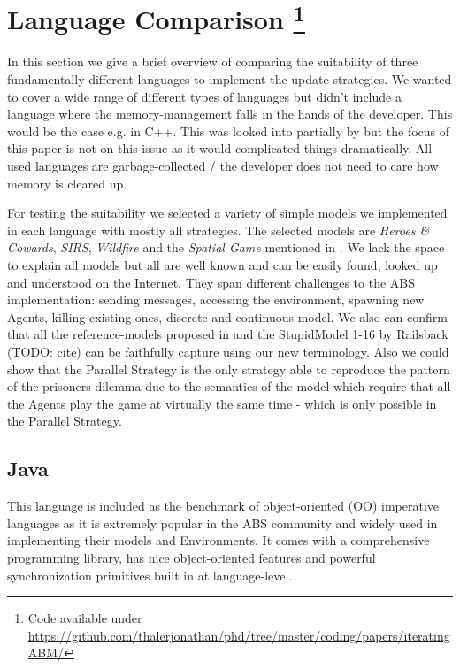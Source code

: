\section[Language Comparison]{Language Comparison \footnote{Code available under\\ \url{https://github.com/thalerjonathan/phd/tree/master/coding/papers/iteratingABM/}}}
In this section we give a brief overview of comparing the suitability of three fundamentally different languages to implement the update-strategies. We wanted to cover a wide range of different types of languages but didn't include a language where the memory-management falls in the hands of the developer. This would be the case e.g. in C++. This was looked into partially by \cite{dawson_opening_2014} but the focus of this paper is not on this issue as it would complicated things dramatically. All used languages are garbage-collected / the developer does not need to care how memory is cleared up.

For testing the suitability we selected a variety of simple models we implemented in each language with mostly all strategies. The selected models are \textit{Heroes \& Cowards}, \textit{SIRS}, \textit{Wildfire} and the \textit{Spatial Game} mentioned in \cite{huberman_evolutionary_1993}. We lack the space to explain all models but all are well known and can be easily found, looked up and understood on the Internet. They span different challenges to the ABS implementation: sending messages, accessing the environment, spawning new Agents, killing existing ones, discrete and continuous model. We also can confirm that all the reference-models proposed in \cite{isaac_abm_2011} and the StupidModel 1-16 by Railsback (TODO: cite) can be faithfully capture using our new terminology. Also we could show that the  Parallel Strategy is the only strategy able to reproduce the pattern of the prisoners dilemma due to the semantics of the model which require that all the Agents play the game at virtually the same time - which is only possible in the Parallel Strategy.



\subsection{Java}
This language is included as the benchmark of object-oriented (OO) imperative languages as it is extremely popular in the ABS community and widely used in implementing their models and Environments. It comes with a comprehensive programming library, has nice object-oriented features and powerful synchronization primitives built in at language-level.

